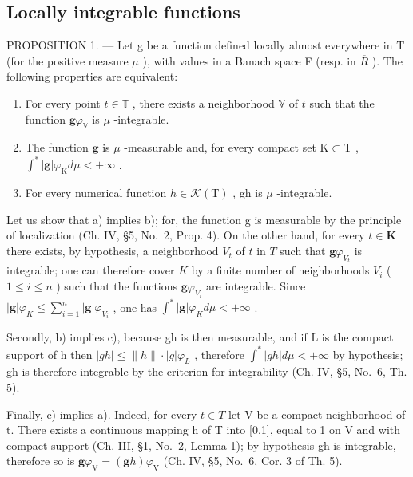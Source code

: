 \subsection{Locally integrable functions}

PROPOSITION 1. --- Let g be a function defined locally almost everywhere in T (for the positive measure \(\mu\) ), with values in a Banach space F (resp. in \(\overline{R}\) ). The following properties are equivalent:

\begin{enumerate}
\def\labelenumi{\alph{enumi})}
\item
  For every point \(t \in \mathbb{T}\) , there exists a neighborhood \(\mathbb{V}\) of \(t\) such that the function \(\mathbf{g}\varphi_{\mathbb{V}}\) is \(\mu\) -integrable.
\item
  The function \(\mathbf{g}\) is \(\mu\) -measurable and, for every compact set \(\mathrm{K} \subset \mathrm{T}\) , \(\int^{*} |\mathbf{g}| \varphi_{\mathrm{K}} d\mu < +\infty\) .
\item
  For every numerical function \(h \in \mathcal{K}(\mathrm{T})\) , gh is \(\mu\) -integrable.
\end{enumerate}

Let us show that a) implies b); for, the function g is measurable by the principle of localization (Ch. IV, §5, No.~2, Prop. 4). On the other hand, for every \(t \in \mathbf{K}\) there exists, by hypothesis, a neighborhood \(V_t\) of \(t\) in \(T\) such that \(\mathbf{g}\varphi_{V_t}\) is integrable; one can therefore cover \(K\) by a finite number of neighborhoods \(V_i\) ( \(1 \leqslant i \leqslant n\) ) such that the functions \(\mathbf{g}\varphi_{V_i}\) are integrable. Since \(|\mathbf{g}| \varphi_K \leqslant \sum_{i=1}^{n} |\mathbf{g}| \varphi_{V_i}\) , one has \(\int^* |\mathbf{g}| \varphi_K d\mu < +\infty\) .

Secondly, b) implies c), because gh is then measurable, and if L is the compact support of h then \(|gh| \leqslant \|h\|\cdot|g|\varphi_{L}\) , therefore \(\int^{*}|gh|d\mu < +\infty\) by hypothesis; gh is therefore integrable by the criterion for integrability (Ch. IV, §5, No.~6, Th. 5).

Finally, c) implies a). Indeed, for every \(t \in T\) let V be a compact neighborhood of t. There exists a continuous mapping h of T into {[}0,1{]}, equal to 1 on V and with compact support (Ch. III, §1, No.~2, Lemma 1); by hypothesis gh is integrable, therefore so is \(\mathbf{g}\varphi_{\mathrm{V}} = (\mathbf{g}h)\varphi_{\mathrm{V}}\) (Ch. IV, §5, No.~6, Cor. 3 of Th. 5).

